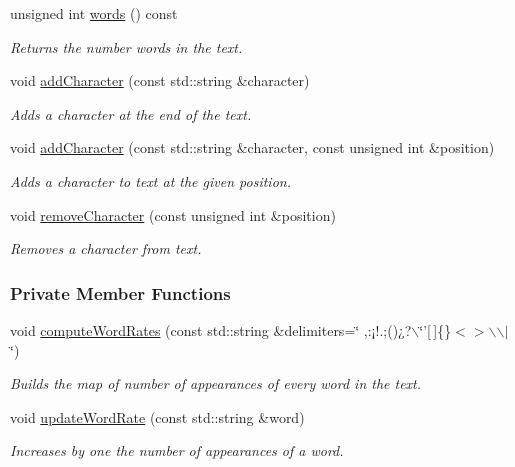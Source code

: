 \begin{CompactItemize}
unsigned int \hyperlink{class_text_edfd71af7802a2d72eed7365f081a66d}{words} () const 
\begin{CompactList}\small\item\em Returns the number words in the text. \item\end{CompactList}\item 
void \hyperlink{class_text_d2c0cb733cef33657a44e4efc9e518ee}{addCharacter} (const std::string \&character)
\begin{CompactList}\small\item\em Adds a character at the end of the text. \item\end{CompactList}\item 
void \hyperlink{class_text_585f0fde5ef0796ccde09a059d90cc3b}{addCharacter} (const std::string \&character, const unsigned int \&position)
\begin{CompactList}\small\item\em Adds a character to text at the given position. \item\end{CompactList}\item 
void \hyperlink{class_text_e04500eeada2a4a3bb00554b32263c52}{removeCharacter} (const unsigned int \&position)
\begin{CompactList}\small\item\em Removes a character from text. \item\end{CompactList}\end{CompactItemize}
\subsubsection*{Private Member Functions}
\begin{CompactItemize}
\item 
void \hyperlink{class_text_efd7305b29212ad1db1a51bb1081b770}{computeWordRates} (const std::string \&delimiters=\char`\"{} ,:¡!.;()¿?$\backslash$\char`\"{}'\mbox{[}$\,$\mbox{]}\{\}$<$$>$$\backslash$$\backslash$$|$\char`\"{})
\begin{CompactList}\small\item\em Builds the map of number of appearances of every word in the text. \item\end{CompactList}\item 
void \hyperlink{class_text_5ab8f9bfa566de537a167991fe10eff5}{updateWordRate} (const std::string \&word)
\begin{CompactList}\small\item\em Increases by one the number of appearances of a word. \item\end{CompactList}\end{CompactItemize}
